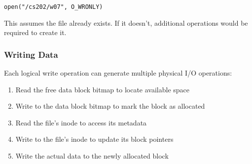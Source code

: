 \documentclass[../../compsys.tex]{subfiles}
\begin{document}
\begin{example}
\texttt{open("/cs202/w07", O\_WRONLY)}
\end{example}

This assumes the file already exists. If it doesn't, additional operations would be required to create it.

\subsubsection{Writing Data}
Each logical write operation can generate multiple physical I/O operations:

\begin{enumerate}
    \item Read the free data block bitmap to locate available space
    \item Write to the data block bitmap to mark the block as allocated
    \item Read the file's inode to access its metadata
    \item Write to the file's inode to update its block pointers
    \item Write the actual data to the newly allocated block
\end{enumerate}
\end{document}
